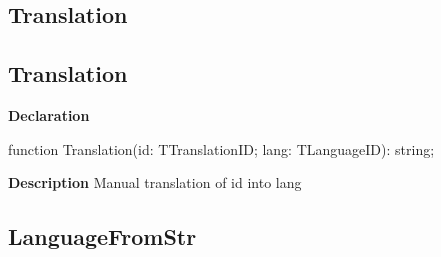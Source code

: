 \documentclass{report}
\newif\ifpdf
\begin{document}
\subsection*{\large{\textbf{Translation}}\normalsize\hspace{1ex}\hrulefill}
\else
\subsection*{Translation}
\fi
\label{PasDoc_Languages-Translation}
\begin{list}{}{
\setlength{\itemindent}{0cm}
\setlength{\listparindent}{0cm}
\setlength{\leftmargin}{\evensidemargin}
\addtolength{\leftmargin}{\tmplength}
\settowidth{\labelsep}{X}
\addtolength{\leftmargin}{\labelsep}
\setlength{\labelwidth}{\tmplength}
}
\item[\textbf{Declaration}\hfill]
\ifpdf
\begin{flushleft}
\fi
\begin{ttfamily}
function Translation(id: TTranslationID; lang: TLanguageID): string;\end{ttfamily}

\ifpdf
\end{flushleft}
\fi

\par
\item[\textbf{Description}]
Manual translation of id into lang

\end{list}
\ifpdf
\subsection*{\large{\textbf{LanguageFromStr}}\normalsize\hspace{1ex}\hrulefill}
\else
\end{document}
